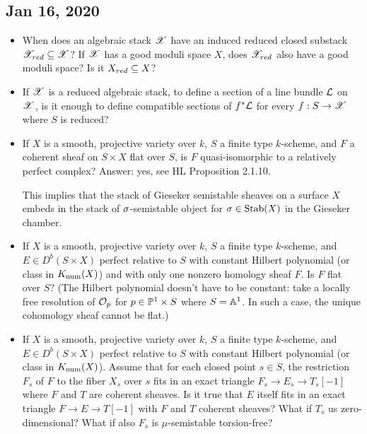 \documentclass[letterpaper,10pt]{article}
\begin{document}
\subsection*{Jan 16, 2020}
\begin{itemize}
    \item When does an algebraic stack $\mathscr{X}$ have an induced reduced closed substack $\mathscr{X}_{red} \subseteq \mathscr{X}$? If $\mathscr{X}$ has a good moduli space $X$, does $\mathscr{X}_{red}$ also have a good moduli space? Is it $X_{red} \subseteq X$?
    
    \item If $\mathscr{X}$ is a reduced algebraic stack, to define a section of a line bundle $\mathcal{L}$ on $\mathscr{X}$, is it enough to define compatible sections of $f^*\mathcal{L}$ for every $f: S \to \mathscr{X}$ where $S$ is reduced?
    
    \item If $X$ is a smooth, projective variety over $k$, $S$ a finite type $k$-scheme, and $F$ a coherent sheaf on $S \times X$ flat over $S$, is $F$ quasi-isomorphic to a relatively perfect complex? Answer: yes, see HL Proposition 2.1.10.
    
    This implies that the stack of Gieseker semistable sheaves on a surface $X$ embeds in the stack of $\sigma$-semistable object for $\sigma \in \operatorname{\mathrm{Stab}}(X)$ in the Gieseker chamber. 
    
    \item If $X$ is a smooth, projective variety over $k$, $S$ a finite type $k$-scheme, and $E \in D^b(S \times X)$ perfect relative to $S$ with constant Hilbert polynomial (or class in $K_{\mathrm{num}}(X)$) and with only one nonzero homology sheaf $F$. Is $F$ flat over $S$? (The Hilbert polynomial doesn't have to be constant: take a locally free resolution of $\mathcal{O}_p$ for $p \in \mathbb{P}^1 \times S$ where $S = \mathbb{A}^1$. In such a case, the unique cohomology sheaf cannot be flat.)
    
    \item If $X$ is a smooth, projective variety over $k$, $S$ a finite type $k$-scheme, and $E \in D^b(S \times X)$ perfect relative to $S$ with constant Hilbert polynomial (or class in $K_{\mathrm{num}}(X)$). Assume that for each closed point $s \in S$, the restriction $F_s$ of $F$ to the fiber $X_s$ over $s$ fits in an exact triangle $F_s \to E_s \to T_s[-1]$ where $F$ and $T$ are coherent sheaves. Is it true that $E$ itself fits in an exact triangle $F \to E \to T[-1]$ with $F$ and $T$ coherent sheaves? What if $T_s$ us zero-dimensional? What if also $F_s$ is $\mu$-semistable torsion-free?
    

\end{itemize}
\end{document}

